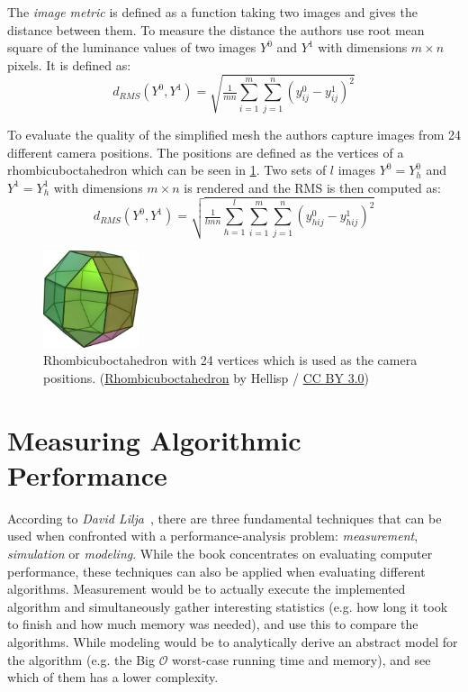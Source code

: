 The \emph{image metric} is defined as a function taking two images and gives the distance between them. To measure the distance the authors use root mean square of the luminance values of two images $Y^0$ and $Y^1$ with dimensions $m \times n$ pixels. It is defined as:
\begin{equation} \label{eq:rms_images}
  d_{RMS}(Y^0,Y^1) = \sqrt{\tfrac{1}{mn}\sum^m_{i=1}\sum^n_{j=1}(y^0_{ij} - y^1_{ij})^2}
\end{equation}

To evaluate the quality of the simplified mesh the authors capture images from 24 different camera positions. The positions are defined as the vertices of a rhombicuboctahedron which can be seen in \cref{fig:rhombicuboctahedron}. Two sets of $l$ images $Y^0 = {Y^0_h}$ and $Y^1 = {Y^1_h}$ with dimensions $m \times n$ is rendered and the RMS is then computed as:
\begin{equation}  \label{eq:rms_image_sets}
  d_{RMS}(Y^0,Y^1) = \sqrt{\tfrac{1}{lmn}\sum^l_{h=1}\sum^m_{i=1}\sum^n_{j=1}(y^0_{hij} - y^1_{hij})^2}
\end{equation}

\begin{figure}[h]
    \centering
    \includegraphics[width=0.25\textwidth]{figures/591px-Rhombicuboctahedron.jpg}
    \caption{Rhombicuboctahedron with 24 vertices which is used as the camera positions. 
      (\href{https://commons.wikimedia.org/wiki/File:Rhombicuboctahedron.jpg}{Rhombicuboctahedron} by Hellisp / \href{https://creativecommons.org/licenses/by/3.0/}{CC BY 3.0})}
    \label{fig:rhombicuboctahedron}
\end{figure}

\section{Measuring Algorithmic Performance} \label{sec:measuring_algorithmic_performance}

According to \emph{David Lilja}~\cite[p.~4]{lilja2005measuring}, there are three fundamental techniques that can be used when confronted with a performance-analysis problem: \emph{measurement}, \emph{simulation} or \emph{modeling}. While the book concentrates on evaluating computer performance, these techniques can also be applied when evaluating different algorithms. Measurement would be to actually execute the implemented algorithm and simultaneously gather interesting statistics (e.g. how long it took to finish and how much memory was needed), and use this to compare the algorithms. While modeling would be to analytically derive an abstract model for the algorithm (e.g. the Big \(\mathcal{O}\) worst-case running time and memory), and see which of them has a lower complexity.


